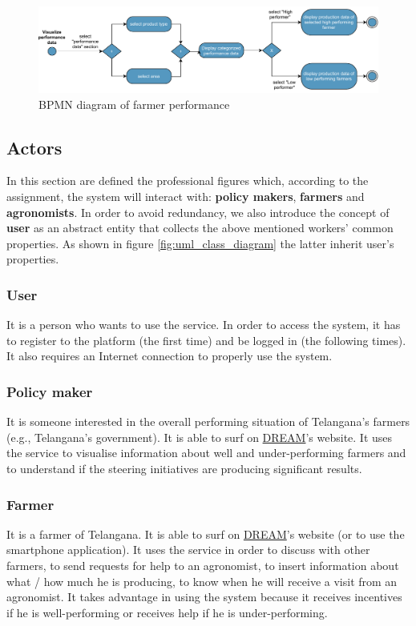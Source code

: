 \begin{figure}[H]
	\centering
    \includegraphics[width=\textwidth]{Images/BPMN/Performance.pdf}
	\caption{\label{fig:bpmn_performance}BPMN diagram of farmer performance}
\end{figure}

\subsection{Actors}
\label{sec:actors}
In this section are defined the professional figures which, according to the assignment, the system will interact with: \textbf{policy makers}, \textbf{farmers} and \textbf{agronomists}. In order to avoid redundancy, we also introduce the concept of \textbf{user} as an abstract entity that collects the above mentioned workers' common properties. As shown in figure \ref{fig:uml_class_diagram} the latter inherit user's properties.
\subsubsection{User}
It is a person who wants to use the service. In order to access the system, it has to register to the platform (the first time) and be logged in (the following times). It also requires an Internet connection to properly use the system.
\subsubsection{Policy maker}
It is someone interested in the overall performing situation of Telangana’s farmers (e.g., Telangana’s government). It is able to surf on \hyperref[tab:acronymsTable]{DREAM}’s website. It uses the service to visualise information about well and under-performing farmers and to understand if the steering initiatives are producing significant results.
\subsubsection{Farmer}
It is a farmer of Telangana. It is able to surf on \hyperref[tab:acronymsTable]{DREAM}’s website (or to use the smartphone application). It uses the service in order to discuss with other farmers, to send requests for help to an agronomist, to insert information about what / how much he is producing, to know when he will receive a visit from an agronomist. It takes advantage in using the system because it receives incentives if he is well-performing or receives help if he is under-performing.
